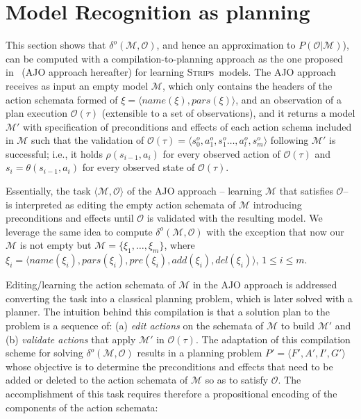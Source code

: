 \documentclass[letterpaper]{article} %
\newcommand{\tup}[1]{{\langle #1 \rangle}}
\newcommand{\strips}{\textsc{Strips}}     %
\begin{document}
\section{Model Recognition as planning}

This section shows that $\delta^o(\mathcal{M},\mathcal{O})$, and hence an approximation to $P(\mathcal{O}|\mathcal{M})$), can be computed with a compilation-to-planning approach as the one proposed in~\cite{aineto2018learning} (AJO approach hereafter) for learning \strips\ models. The AJO approach receives as input an empty model $\mathcal{M}$, which only contains the headers of the action schemata formed of $\xi=\tup{name(\xi),pars(\xi)}$, and an observation of a plan execution $\mathcal{O}(\tau)$ (extensible to a set of observations), and it returns a model $\mathcal{M'}$ with specification of preconditions and effects of each action schema included in $\mathcal{M}$ such that the validation of $\mathcal{O}(\tau)=\tup{s_0^o,a_1^o,s_1^o \ldots , a_l^o, s_m^o}$ following $\mathcal{M'}$ is successful; i.e., it holds $\rho(s_{i-1},a_i)$ for every observed action of $\mathcal{O}(\tau)$ and $s_i=\theta(s_{i-1},a_i)$ for every observed state of $\mathcal{O}(\tau)$.

Essentially, the task $\tup{\mathcal{M},\mathcal{O}}$ of the AJO approach -- learning $\mathcal{M}$ that satisfies $\mathcal{O}$-- is interpreted as editing the empty action schemata of $\mathcal{M}$ introducing preconditions and effects until $\mathcal{O}$ is validated with the resulting model. We leverage the same idea to compute $\delta^o(\mathcal{M},\mathcal{O})$ with the exception that now our $\mathcal{M}$ is not empty but $\mathcal{M}=\{\xi_1, \ldots, \xi_m\}$, where $\xi_i=\tup{name(\xi_i),pars(\xi_i),pre(\xi_i),add(\xi_i),del(\xi_i)}$, $1 \leq i \leq m$.

Editing/learning the action schemata of $\mathcal{M}$ in the AJO approach is addressed converting the task into a classical planning problem, which is later solved with a planner. The intuition behind this compilation is that a solution plan to the problem is a sequence of: (a) \emph{edit actions} on the schemata of $\mathcal{M}$ to build $\mathcal{M'}$ and (b) \emph{validate actions} that apply $\mathcal{M'}$ in $\mathcal{O(\tau)}$. The adaptation of this compilation scheme for solving $\delta^o(\mathcal{M},\mathcal{O})$ results in a planning problem $P'=\tup{F',A',I',G'}$ whose objective is to determine the preconditions and effects that need to be added or deleted to the action schemata of $\mathcal{M}$ so as to satisfy $\mathcal{O}$. The accomplishment of this task requires therefore a propositional encoding of the components of the action schemata:
\end{document}
